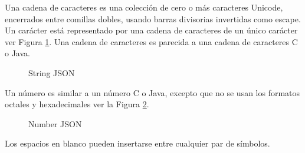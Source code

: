 Una cadena de caracteres es una colecci\'on de cero o m\'as caracteres Unicode, encerrados entre comillas dobles, usando barras divisorias invertidas como escape. Un car\'acter est\'a representado por una cadena de caracteres de un \'unico car\'acter ver Figura \ref{fig:stringJSON}. Una cadena de caracteres es parecida a una cadena de caracteres C o Java.

\begin{figure}[H]
\centering
{}
\caption{String JSON} \label{fig:stringJSON}
\end{figure}

Un n\'umero es similar a un n\'umero C o Java, excepto que no se usan los formatos octales y hexadecimales ver la Figura \ref{fig:numberJSON}.

\begin{figure}[H]
\centering
{}
\caption{Number JSON} \label{fig:numberJSON}
\end{figure}

Los espacios en blanco pueden insertarse entre cualquier par de s\'imbolos.

